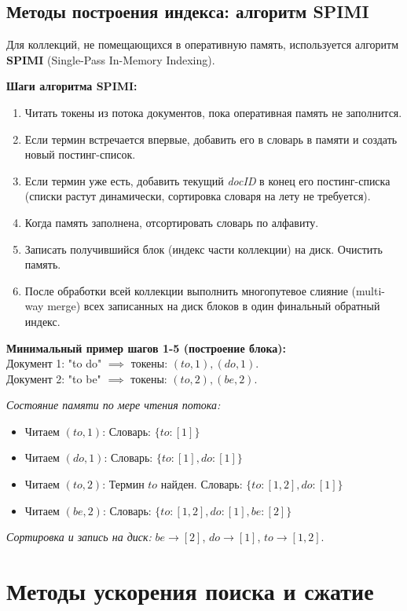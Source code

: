 \documentclass[12pt,a4paper]{article}
\begin{document}
\subsection{Методы построения индекса: алгоритм SPIMI}
Для коллекций, не помещающихся в оперативную память, используется алгоритм \textbf{SPIMI} (Single-Pass In-Memory Indexing).

\textbf{Шаги алгоритма SPIMI:}
\begin{enumerate}
    \item Читать токены из потока документов, пока оперативная память не заполнится.
    \item Если термин встречается впервые, добавить его в словарь в памяти и создать новый постинг-список.
    \item Если термин уже есть, добавить текущий \textit{docID} в конец его постинг-списка (списки растут динамически, сортировка словаря на лету не требуется).
    \item Когда память заполнена, отсортировать словарь по алфавиту.
    \item Записать получившийся блок (индекс части коллекции) на диск. Очистить память.
    \item После обработки всей коллекции выполнить многопутевое слияние (multi-way merge) всех записанных на диск блоков в один финальный обратный индекс.
\end{enumerate}

\textbf{Минимальный пример шагов 1-5 (построение блока):}\\
Документ 1: "to do" $\implies$ токены: $(to, 1), (do, 1)$.\\
Документ 2: "to be" $\implies$ токены: $(to, 2), (be, 2)$.

\textit{Состояние памяти по мере чтения потока:}
\begin{itemize}
    \item Читаем $(to, 1)$: Словарь: $\{to: [1]\}$
    \item Читаем $(do, 1)$: Словарь: $\{to: [1], do: [1]\}$
    \item Читаем $(to, 2)$: Термин $to$ найден. Словарь: $\{to: [1, 2], do: [1]\}$
    \item Читаем $(be, 2)$: Словарь: $\{to: [1, 2], do: [1], be: [2]\}$
\end{itemize}
\textit{Сортировка и запись на диск:}
$be \rightarrow [2]$,
$do \rightarrow [1]$,
$to \rightarrow [1, 2]$.

\section{Методы ускорения поиска и сжатие}
\end{document}
